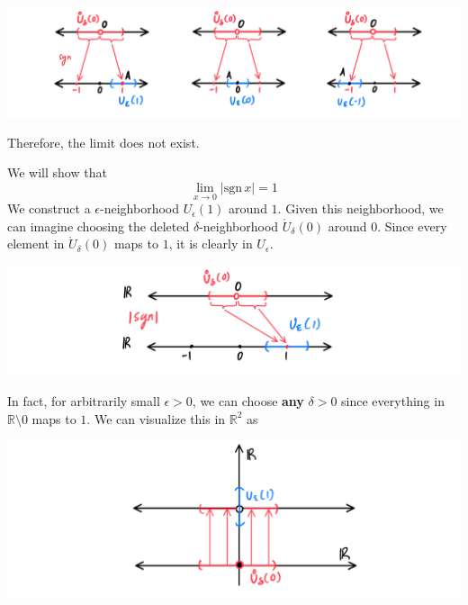 \documentclass{article}
\begin{document}
\begin{example}
\begin{enumerate}
      \end{enumerate}
      \begin{center}
          \includegraphics[scale=0.25]{img/Limit_of_Sign_Function_1_0_-1.PNG}
      \end{center}
      Therefore, the limit does not exist. 
    \end{example}

    \begin{example}
      We will show that 
      \[\lim_{x \rightarrow 0} |\text{sgn}\,x| = 1\]
      We construct a $\epsilon$-neighborhood $U_\epsilon (1)$ around $1$. Given this neighborhood, we can imagine choosing the deleted $\delta$-neighborhood $\mathring{U}_\delta (0)$ around $0$. Since every element in $\mathring{U}_\delta (0)$ maps to $1$, it is clearly in $U_\epsilon$. 
      \begin{center}
          \includegraphics[scale=0.25]{img/Absolute_Value_of_Signum.PNG}
      \end{center}
      In fact, for arbitrarily small $\epsilon > 0$, we can choose \textbf{any} $\delta>0$ since everything in $\mathbb{R} \setminus 0$ maps to $1$. We can visualize this in $\mathbb{R}^2$ as
      \begin{center}
          \includegraphics[scale=0.25]{img/Absolute_Value_of_Signum_2.PNG}
      \end{center}
    \end{example}
\end{document}
